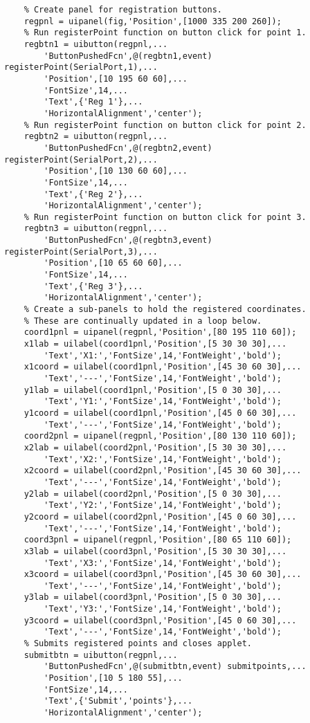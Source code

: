 \begin{lstlisting}
	% Create panel for registration buttons.
    regpnl = uipanel(fig,'Position',[1000 335 200 260]);
	% Run registerPoint function on button click for point 1.
    regbtn1 = uibutton(regpnl,...
        'ButtonPushedFcn',@(regbtn1,event) registerPoint(SerialPort,1),...
        'Position',[10 195 60 60],...
        'FontSize',14,...
        'Text',{'Reg 1'},...
        'HorizontalAlignment','center');
	% Run registerPoint function on button click for point 2.
    regbtn2 = uibutton(regpnl,...
        'ButtonPushedFcn',@(regbtn2,event) registerPoint(SerialPort,2),...
        'Position',[10 130 60 60],...
        'FontSize',14,...
        'Text',{'Reg 2'},...
        'HorizontalAlignment','center');
	% Run registerPoint function on button click for point 3.
    regbtn3 = uibutton(regpnl,...
        'ButtonPushedFcn',@(regbtn3,event) registerPoint(SerialPort,3),...
        'Position',[10 65 60 60],...
        'FontSize',14,...
        'Text',{'Reg 3'},...
        'HorizontalAlignment','center');
	% Create a sub-panels to hold the registered coordinates.
	% These are continually updated in a loop below.
    coord1pnl = uipanel(regpnl,'Position',[80 195 110 60]);
    x1lab = uilabel(coord1pnl,'Position',[5 30 30 30],...
        'Text','X1:','FontSize',14,'FontWeight','bold');
    x1coord = uilabel(coord1pnl,'Position',[45 30 60 30],...
        'Text','---','FontSize',14,'FontWeight','bold');
    y1lab = uilabel(coord1pnl,'Position',[5 0 30 30],...
        'Text','Y1:','FontSize',14,'FontWeight','bold');
    y1coord = uilabel(coord1pnl,'Position',[45 0 60 30],...
        'Text','---','FontSize',14,'FontWeight','bold');
    coord2pnl = uipanel(regpnl,'Position',[80 130 110 60]);
    x2lab = uilabel(coord2pnl,'Position',[5 30 30 30],...
        'Text','X2:','FontSize',14,'FontWeight','bold');
    x2coord = uilabel(coord2pnl,'Position',[45 30 60 30],...
        'Text','---','FontSize',14,'FontWeight','bold');
    y2lab = uilabel(coord2pnl,'Position',[5 0 30 30],...
        'Text','Y2:','FontSize',14,'FontWeight','bold');
    y2coord = uilabel(coord2pnl,'Position',[45 0 60 30],...
        'Text','---','FontSize',14,'FontWeight','bold');
    coord3pnl = uipanel(regpnl,'Position',[80 65 110 60]);
    x3lab = uilabel(coord3pnl,'Position',[5 30 30 30],...
        'Text','X3:','FontSize',14,'FontWeight','bold');
    x3coord = uilabel(coord3pnl,'Position',[45 30 60 30],...
        'Text','---','FontSize',14,'FontWeight','bold');
    y3lab = uilabel(coord3pnl,'Position',[5 0 30 30],...
        'Text','Y3:','FontSize',14,'FontWeight','bold');
    y3coord = uilabel(coord3pnl,'Position',[45 0 60 30],...
        'Text','---','FontSize',14,'FontWeight','bold');
	% Submits registered points and closes applet.
    submitbtn = uibutton(regpnl,...
        'ButtonPushedFcn',@(submitbtn,event) submitpoints,...
        'Position',[10 5 180 55],...
        'FontSize',14,...
        'Text',{'Submit','points'},...
        'HorizontalAlignment','center');
    

\end{lstlisting}
